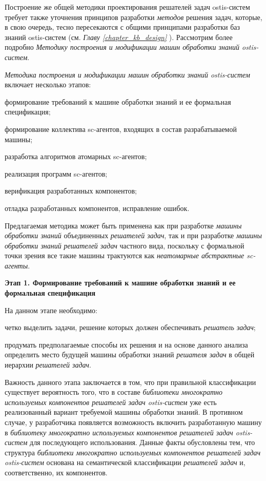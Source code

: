 Построение же общей методики проектирования решателей задач ostis-систем требует также уточнения принципов разработки \textit{методов} решения задач, которые, в свою очередь, тесно пересекаются с общими принципами разработки баз знаний ostis-систем (см. \textit{Главу \ref{chapter_kb_design} }). Рассмотрим более подробно \textit{Методику построения и модификации машин обработки знаний ostis-систем}.

\textit{Методика построения и модификации машин обработки знаний ostis-систем} включает несколько этапов:
\begin{textitemize}
    \item формирование требований к машине обработки знаний и ее формальная спецификация;
    \item формирование коллектива sc-агентов, входящих в состав разрабатываемой машины;
    \item разработка алгоритмов атомарных sc-агентов;
    \item реализация программ sc-агентов;
    \item верификация разработанных компонентов;
    \item отладка разработанных компонентов, исправление ошибок.
\end{textitemize}

Предлагаемая методика может быть применена как при разработке \textit{машины обработки знаний} объединенных \textit{решателей задач}, так и при разработке \textit{машины обработки знаний} \textit{решателей задач} частного вида, поскольку с формальной точки зрения все такие машины трактуются как \textit{неатомарные абстрактные sc-агенты}.

\textbf{Этап 1. Формирование требований к машине обработки знаний и ее формальная спецификация}

На данном этапе необходимо:
\begin{textitemize}
\item четко выделить задачи, решение которых должен обеспечивать \textit{решатель задач};
\item продумать предполагаемые способы их решения и на основе данного анализа определить место будущей машины обработки знаний \textit{решателя задач} в общей иерархии \textit{решателей задач}.
\end{textitemize}

Важность данного этапа заключается в том, что при правильной классификации существует вероятность того, что в составе \textit{библиотеки многократно используемых компонентов решателей задач ostis-систем} уже есть реализованный вариант требуемой машины обработки знаний. В противном случае, у разработчика появляется возможность включить разработанную машину в \textit{библиотеку многократно используемых компонентов решателей задач ostis-систем} для последующего использования. Данные факты обусловлены тем, что структура \textit{библиотеки многократно используемых компонентов решателей задач ostis-систем} основана на семантической классификации \textit{решателей задач} и, соответственно, их компонентов.


